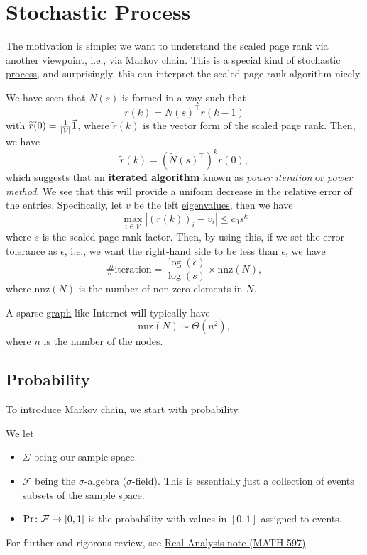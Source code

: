 \chapter{Stochastic Process}
The motivation is simple: we want to understand the scaled page rank via another viewpoint, i.e., via \hyperref[def:Markov-chain]{Markov chain}.
This is a special kind of \hyperref[def:stochastic-process]{stochastic process}, and surprisingly, this can interpret the scaled page rank
algorithm nicely.

\begin{prev}
	We have seen that \(\widetilde{N}(s)\) is formed in a way such that
	\[
		\widetilde{r}(k) = \widetilde{N}(s)^{\top}\widetilde{r}(k - 1)
	\]
	with \(\widetilde{r}(0) = \frac{1}{\left\vert \mathcal{\MakeUppercase{v}} \right\vert }\vec{1}\), where \(\widetilde{r}(k)\) is the vector
	form of the scaled page rank. Then, we have
	\[
		\widetilde{r}(k) = \left(\widetilde{N}(s)^{\top}\right)^k r(0),
	\]
	which suggests that an \textbf{iterated algorithm} known as \emph{power iteration} or \emph{power method}. We see that this will provide
	a uniform decrease in the relative error of the entries. Specifically, let \(v\) be the left \hyperref[def:eigenvalue]{eigenvalues}, then we have
	\[
		\max_{i\in \mathcal{V}}\left\vert (r(k))_i - v_i\right\vert \leq c_0 s^k
	\]
	where \(s\) is the scaled page rank factor. Then, by using this, if we set the error tolerance as \(\epsilon\), i.e., we want the right-hand
	side to be less than \(\epsilon \), we have
	\[
		\#\text{iteration} = \frac{\log(\epsilon)}{\log(s)}\times \mathrm{nnz}(N),
	\]
	where \(\mathrm{nnz}(N)\) is the number of non-zero elements in \(N\).
	\begin{remark}
		A sparse \hyperref[def:graph]{graph} like Internet will typically have
		\[
			\mathrm{nnz}(N)\sim\Theta(n^2),
		\]
		where \(n\) is the number of the nodes.
	\end{remark}
\end{prev}


\section{Probability}
To introduce \hyperref[def:Markov-chain]{Markov chain}, we start with probability.
\begin{prev}
	We let
	\begin{itemize}
		\item \(\Sigma\) being our sample space.
		\item \(\mathcal{F}\) being the \(\sigma\)-algebra (\(\sigma \)-field). This is essentially just a collection of events subsets of the sample space.
		\item \(\Pr \colon \mathcal{\MakeUppercase{f}} \to [0, 1]\) is the probability with values in \([0, 1]\) assigned to events.
	\end{itemize}
	For further and rigorous review, see \href{https://www.pbb.wtf/posts/Notes#real-analysis-math597-umich}{Real Analysis note (MATH 597)}.
\end{prev}

